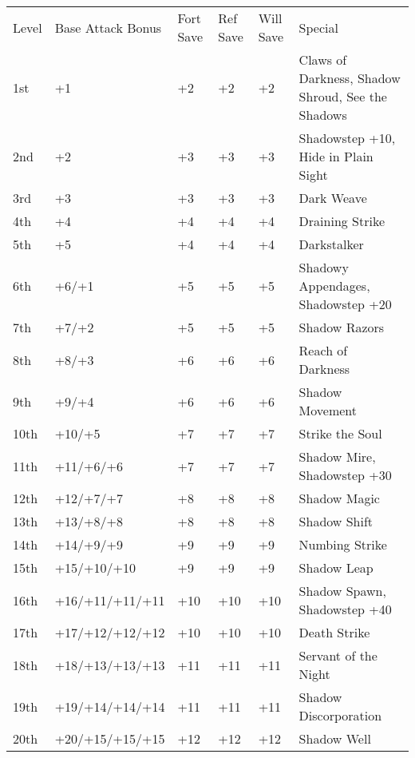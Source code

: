  \label{comm:class:shadowwarrior}
\vspace*{-8pt}









\begin{table}[tbh]
\begin{small}
\begin{tabular}{lp{3cm}p{0.7cm}p{0.7cm}p{0.7cm}l}
Level &Base Attack Bonus &Fort Save &Ref Save &Will Save &Special\\
1st &+1 &+2 &+2 &+2 &Claws of Darkness, Shadow Shroud, See the Shadows\\
2nd &+2 &+3 &+3 &+3 &Shadowstep +10, Hide in Plain Sight\\
3rd &+3 &+3 &+3 &+3 &Dark Weave\\
4th &+4 &+4 &+4 &+4 &Draining Strike\\
5th &+5 &+4 &+4 &+4 &Darkstalker\\
6th &+6/+1 &+5 &+5 &+5 &Shadowy Appendages, Shadowstep +20\\
7th &+7/+2 &+5 &+5 &+5 &Shadow Razors\\
8th &+8/+3 &+6 &+6 &+6 &Reach of Darkness\\
9th &+9/+4 &+6 &+6 &+6 &Shadow Movement\\
10th &+10/+5 &+7 &+7 &+7 &Strike the Soul\\
11th &+11/+6/+6 &+7 &+7 &+7 &Shadow Mire, Shadowstep +30\\
12th &+12/+7/+7 &+8 &+8 &+8 &Shadow Magic\\
13th &+13/+8/+8 &+8 &+8 &+8 &Shadow Shift\\
14th &+14/+9/+9 &+9 &+9 &+9 &Numbing Strike\\
15th &+15/+10/+10 &+9 &+9 &+9 &Shadow Leap\\
16th &+16/+11/+11/+11 &+10 &+10 &+10 &Shadow Spawn, Shadowstep +40\\
17th &+17/+12/+12/+12 &+10 &+10 &+10 &Death Strike\\
18th &+18/+13/+13/+13 &+11 &+11 &+11 &Servant of the Night\\
19th &+19/+14/+14/+14 &+11 &+11 &+11 &Shadow Discorporation\\
20th &+20/+15/+15/+15 &+12 &+12 &+12 &Shadow Well
\end{tabular}
\end{small}
\end{table}

